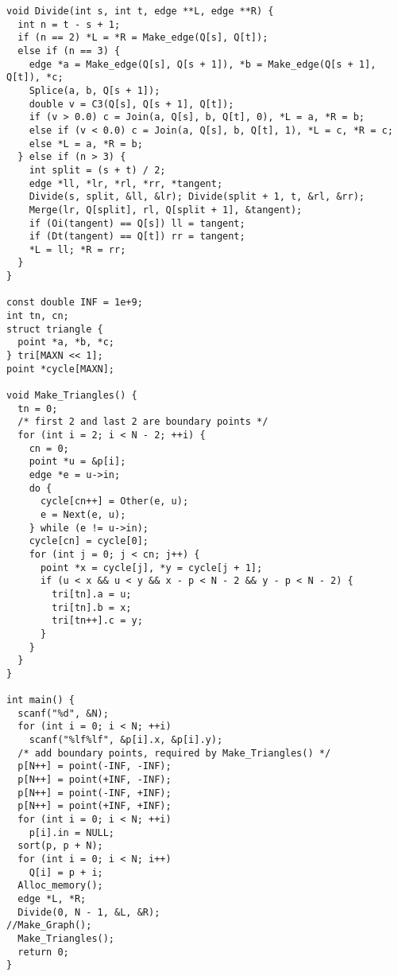 \begin{verbatim}
void Divide(int s, int t, edge **L, edge **R) {
  int n = t - s + 1;
  if (n == 2) *L = *R = Make_edge(Q[s], Q[t]);
  else if (n == 3) {
    edge *a = Make_edge(Q[s], Q[s + 1]), *b = Make_edge(Q[s + 1], Q[t]), *c;
    Splice(a, b, Q[s + 1]);
    double v = C3(Q[s], Q[s + 1], Q[t]);
    if (v > 0.0) c = Join(a, Q[s], b, Q[t], 0), *L = a, *R = b;
    else if (v < 0.0) c = Join(a, Q[s], b, Q[t], 1), *L = c, *R = c;
    else *L = a, *R = b;
  } else if (n > 3) {
    int split = (s + t) / 2;
    edge *ll, *lr, *rl, *rr, *tangent;
    Divide(s, split, &ll, &lr); Divide(split + 1, t, &rl, &rr);
    Merge(lr, Q[split], rl, Q[split + 1], &tangent);
    if (Oi(tangent) == Q[s]) ll = tangent;
    if (Dt(tangent) == Q[t]) rr = tangent;
    *L = ll; *R = rr;
  }
}

const double INF = 1e+9;
int tn, cn;
struct triangle { 
  point *a, *b, *c; 
} tri[MAXN << 1];
point *cycle[MAXN];

void Make_Triangles() {
  tn = 0;
  /* first 2 and last 2 are boundary points */
  for (int i = 2; i < N - 2; ++i) {
    cn = 0;
    point *u = &p[i];
    edge *e = u->in;
    do {
      cycle[cn++] = Other(e, u);
      e = Next(e, u);
    } while (e != u->in);
    cycle[cn] = cycle[0];
    for (int j = 0; j < cn; j++) {
      point *x = cycle[j], *y = cycle[j + 1];
      if (u < x && u < y && x - p < N - 2 && y - p < N - 2) {
        tri[tn].a = u;
        tri[tn].b = x;
        tri[tn++].c = y;
      }
    }
  }
}

int main() {
  scanf("%d", &N);
  for (int i = 0; i < N; ++i)
    scanf("%lf%lf", &p[i].x, &p[i].y);
  /* add boundary points, required by Make_Triangles() */
  p[N++] = point(-INF, -INF);
  p[N++] = point(+INF, -INF);
  p[N++] = point(-INF, +INF);
  p[N++] = point(+INF, +INF);
  for (int i = 0; i < N; ++i)
    p[i].in = NULL;
  sort(p, p + N);
  for (int i = 0; i < N; i++) 
    Q[i] = p + i;
  Alloc_memory();
  edge *L, *R;
  Divide(0, N - 1, &L, &R);
//Make_Graph();
  Make_Triangles();
  return 0;
}
\end{verbatim}
